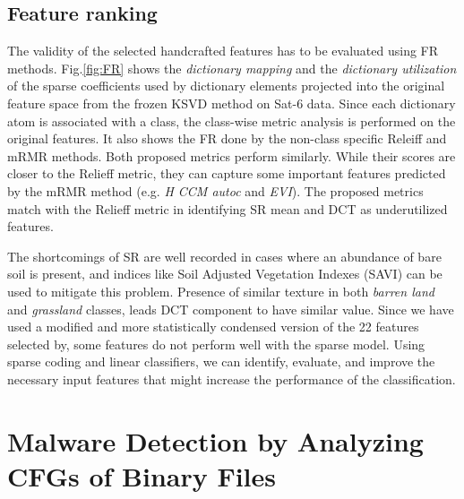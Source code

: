 \subsection{Feature ranking}

The validity of the selected handcrafted features has to be evaluated using FR methods. Fig.\ref{fig:FR} shows the \textit{dictionary mapping} and the \textit{dictionary utilization} of the sparse coefficients used by dictionary elements projected into the original feature space from the frozen KSVD method on Sat-6 data. Since each dictionary atom is associated with a class, the class-wise metric analysis is performed on the original features. It also shows the FR done by the non-class specific Releiff and mRMR methods. Both proposed metrics perform similarly. While their scores are closer to the Relieff metric, they can capture some important features predicted by the mRMR method (e.g. \textit{H CCM autoc} and \textit{EVI}). The proposed metrics match with the Relieff metric in identifying SR mean and DCT as underutilized features.

The shortcomings of SR are well recorded in cases where an abundance of bare soil is present, and indices like Soil Adjusted Vegetation Indexes (SAVI) can be used to mitigate this problem\cite{Huete1988}. Presence of similar texture in both \textit{barren land} and \textit{grassland} classes, leads DCT component to have similar value. Since we have used a modified and more statistically condensed version of the 22 features selected by\cite{Basu2015}, some features do not perform well with the sparse model. Using sparse coding and linear classifiers, we can identify, evaluate, and improve the necessary input features that might increase the performance of the classification.

\section{Malware Detection by Analyzing CFGs of Binary Files}


